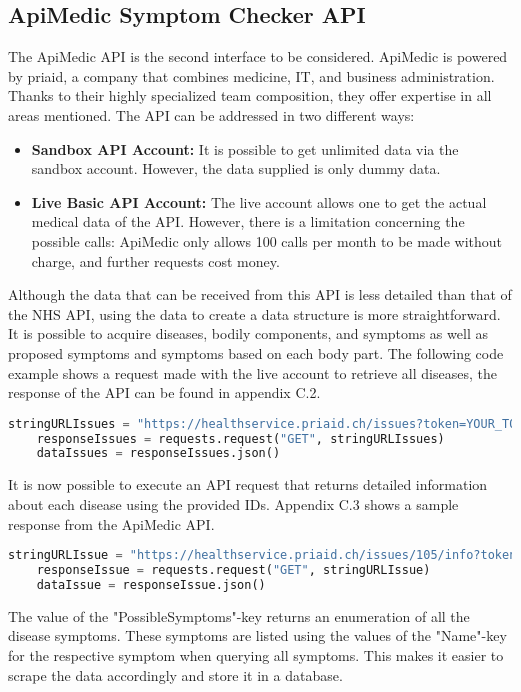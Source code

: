 \subsection{ApiMedic Symptom Checker API}
The ApiMedic API is the second interface to be considered. ApiMedic is powered by priaid, a company that combines medicine, IT, and business administration. Thanks to their highly specialized team composition, they offer expertise in all areas mentioned. The API can be addressed in two different ways:
\begin{itemize}
	\item \textbf{Sandbox API Account:}
	It is possible to get unlimited data via the sandbox account. However, the data supplied is only dummy data.
	\item \textbf{Live Basic API Account:}
	The live account allows one to get the actual medical data of the API. However, there is a limitation concerning the possible calls: ApiMedic only allows 100 calls per month to be made without charge, and further requests cost money.
\end{itemize}
Although the data that can be received from this API is less detailed than that of the NHS API, using the data to create a data structure is more straightforward. It is possible to acquire diseases, bodily components, and symptoms as well as proposed symptoms and symptoms based on each body part. The following code example shows a request made with the live account to retrieve all diseases, the response of the API can be found in appendix C.2.
\begin{lstlisting}[language=Python, caption={Example Python Request for the ApiMedic API (all issues)}]
	stringURLIssues = "https://healthservice.priaid.ch/issues?token=YOUR_TOKEN"
	responseIssues = requests.request("GET", stringURLIssues)
	dataIssues = responseIssues.json()
\end{lstlisting}
\noindent
It is now possible to execute an API request that returns detailed information about each disease using the provided IDs. Appendix C.3 shows a sample response from the ApiMedic API.
\begin{lstlisting}[language=Python, caption={Example Python Request for the ApiMedic API (single issue)}]
	stringURLIssue = "https://healthservice.priaid.ch/issues/105/info?token=YOUR_TOKEN"
	responseIssue = requests.request("GET", stringURLIssue)
	dataIssue = responseIssue.json()
\end{lstlisting}
\noindent 
The value of the "PossibleSymptoms"-key returns an enumeration of all the disease symptoms. These symptoms are listed using the values of the "Name"-key for the respective symptom when querying all symptoms. This makes it easier to scrape the data accordingly and store it in a database.


